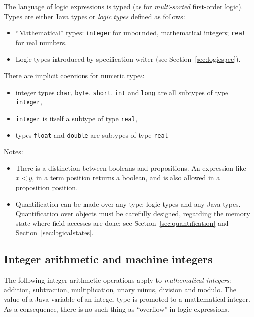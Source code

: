 \documentclass[a4paper,11pt,twoside,openright]{report}
\begin{document}
The language of logic expressions is typed (as for \emph{multi-sorted}
first-order logic). Types are either Java types or \emph{logic types}
defined as follows:
\begin{itemize}
\item ``Mathematical'' types: \verb|integer| for unbounded,
  mathematical integers; \verb|real| for real numbers.
\item Logic types introduced by specification writer (see
  Section~\ref{sec:logicspec}).
\end{itemize}
There are implicit coercions for numeric types:
\begin{itemize}
\item integer types \verb|char|, \verb|byte|, \verb|short|, \verb|int| and
  \verb|long| are all subtypes of type \verb|integer|,
\item \verb|integer| is itself a subtype of type \verb|real|,
\item types \verb|float| and \verb|double| are subtypes of type \verb|real|.
\end{itemize}
Notes:
\begin{itemize}
\item There is a distinction between booleans and propositions. An
  expression like $x<y$, in a term position returns a boolean, and is
  also allowed in a proposition position.
\item Quantification can be made over any type: logic types and any Java
  types. Quantification over objects must be carefully designed,
  regarding the memory state where field accesses are done: see
  Section~\ref{sec:quantification} and
  Section~\ref{sec:logicalstates}.
\end{itemize}


\subsection{Integer arithmetic and machine integers}

The following integer arithmetic operations apply to
\emph{mathematical integers}: addition, subtraction, multiplication,
unary minus, division and modulo. The value of a Java variable of an
integer type is promoted to a mathematical integer. As a consequence,
there is no such thing as ``overflow'' in logic expressions.
\end{document}
